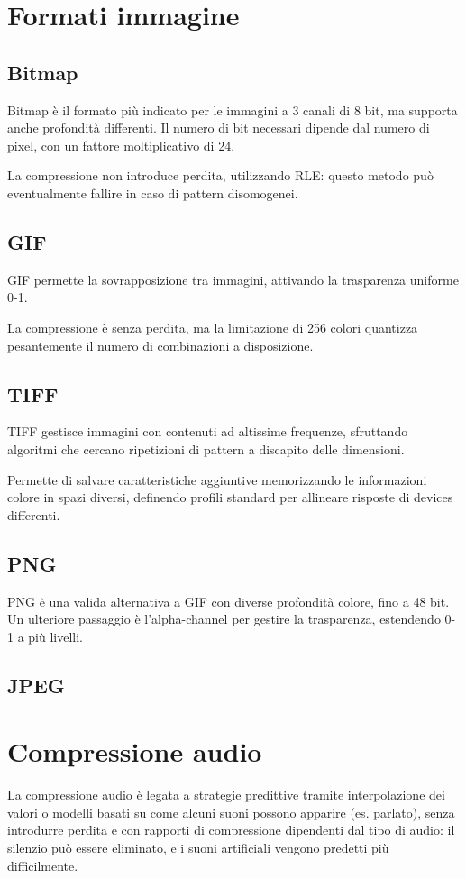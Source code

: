 \section{Formati immagine}

\subsection{Bitmap}
Bitmap è il formato più indicato per le immagini a 3 canali di 8 bit, ma supporta anche profondità differenti. Il numero di bit necessari dipende dal numero di pixel, con un fattore moltiplicativo di 24.

La compressione non introduce perdita, utilizzando RLE: questo metodo può eventualmente fallire in caso di pattern disomogenei. 

\subsection{GIF}
GIF permette la sovrapposizione tra immagini, attivando la trasparenza uniforme 0-1.

La compressione è senza perdita, ma la limitazione di 256 colori quantizza pesantemente il numero di combinazioni a disposizione.

\subsection{TIFF}
TIFF gestisce immagini con contenuti ad altissime frequenze, sfruttando algoritmi che cercano ripetizioni di pattern a discapito delle dimensioni.

Permette di salvare caratteristiche aggiuntive memorizzando le informazioni colore in spazi diversi, definendo profili standard per allineare risposte di devices differenti.

 \subsection{PNG}
 PNG è una valida alternativa a GIF con diverse profondità colore, fino a 48 bit. Un ulteriore passaggio è l'alpha-channel per gestire la trasparenza, estendendo 0-1 a più livelli. 
 
 \subsection{JPEG}
 
 
 \section{Compressione audio}
 La compressione audio è legata a strategie predittive tramite interpolazione dei valori o modelli basati su come alcuni suoni possono apparire (es. parlato), senza introdurre perdita e con rapporti di compressione dipendenti dal tipo di audio: il silenzio può essere eliminato, e i suoni artificiali vengono predetti più difficilmente.
 
